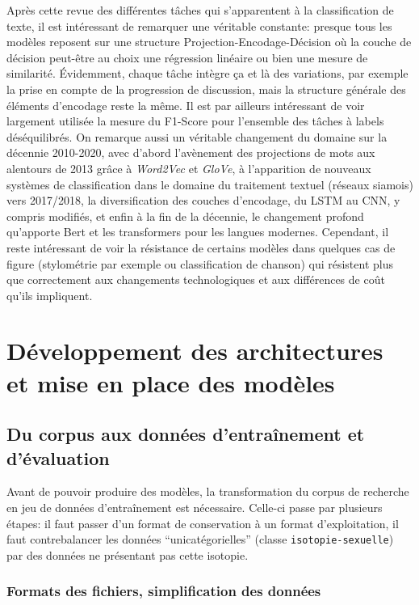 Après cette revue des différentes tâches qui s'apparentent à la classification de texte, il est intéressant de remarquer une véritable constante: presque tous les modèles reposent sur une structure Projection-Encodage-Décision où la couche de décision peut-être au choix une régression linéaire ou bien une mesure de similarité. Évidemment, chaque tâche intègre ça et là des variations, par exemple la prise en compte de la progression de discussion, mais la structure générale des éléments d'encodage reste la même. Il est par ailleurs intéressant de voir largement utilisée la mesure du F1-Score pour l'ensemble des tâches à labels déséquilibrés. On remarque aussi un véritable changement du domaine sur la décennie 2010-2020, avec  d'abord l'avènement des projections de mots aux alentours de 2013 grâce à \textit{Word2Vec} et \textit{GloVe}, à l'apparition de nouveaux systèmes de classification dans le domaine du traitement textuel (réseaux siamois) vers 2017/2018, la diversification des couches d'encodage, du LSTM au CNN, y compris modifiés, et enfin à la fin de la décennie, le changement profond qu'apporte Bert et les transformers pour les langues modernes. Cependant, il reste intéressant de voir la résistance de certains modèles dans quelques cas de figure (stylométrie par exemple ou classification de chanson) qui résistent plus que correctement aux changements technologiques et aux différences de coût qu'ils impliquent.



\section{Développement des architectures et mise en place des modèles}

\subsection{Du corpus aux données d'entraînement et d'évaluation}

Avant de pouvoir produire des modèles, la transformation du corpus de recherche en jeu de données d'entraînement est nécessaire. Celle-ci passe par plusieurs étapes: il faut passer d'un format de conservation à un format d'exploitation, il faut contrebalancer les données \enquote{unicatégorielles} (classe \texttt{isotopie-sexuelle}) par des données ne présentant pas cette isotopie.

\subsubsection{Formats des fichiers, simplification des données}

